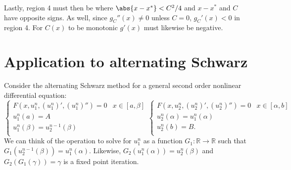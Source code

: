 \documentclass{article}
\begin{document}
Lastly, region 4 must then be where $\abs{x-x^*} < C^2/4$ and $x-x^*$ and $C$ have opposite signs.
As well, since $g_C''(x) \neq 0$ unless $C = 0$, $g_C'(x) < 0$ in region 4.
For $C(x)$ to be monotonic $g'(x)$ must likewise be negative.

\section{Application to alternating Schwarz}
\label{sec:appl}

Consider the alternating Schwarz method for a general second order nonlinear differential equation:
\begin{equation} \label{eq:AS}
\begin{cases} F(x,u_1^n,(u_1^n)',(u_1^n)'') = 0 & x \in [a,\beta] \\
u^n_1(a) = A \\
u^n_1(\beta) = u_2^{n-1}(\beta) \\
\end{cases}
\begin{cases} F(x,u^n_2,(u^n_2)',(u^n_2)'') = 0 & x \in [\alpha,b] \\
u^n_2(\alpha) = u^n_1(\alpha) \\
u^n_2(b) = B . \\
\end{cases}
\end{equation}
We can think of the operation to solve for $u_1^n$ as a function $G_1: \mathbb{R} \rightarrow \mathbb{R}$ such that $G_1(u_2^{n-1}(\beta)) = u_1^n(\alpha)$.
Likewise, $G_2(u_1^n(\alpha)) = u_2^n(\beta)$ and $G_2(G_1(\gamma)) = \gamma$ is a fixed point iteration.
\end{document}
